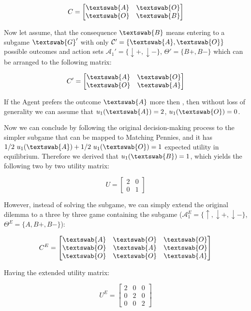 \documentclass{article}
\begin{document}
\[
C=
\begin{bmatrix}
\textswab{A} & \textswab{O} \\
\textswab{O} & \textswab{B}
\end{bmatrix}
\]

Now let assume, that the consequence $\textswab{B}$ means entering to a subgame $\textswab{G}'$ with only $\mathcal{C}'=\{\textswab{A},\textswab{O}\}$ possible outcomes and action sets $\mathcal{A}_1'=\{\downarrow+,\downarrow-\}$, $\Theta'=\{B+,B-\}$ which can be arranged to the following matrix:

\[
C'=
\begin{bmatrix}
\textswab{A} & \textswab{O} \\
\textswab{O} & \textswab{A}
\end{bmatrix}
\]

If the Agent prefers the outcome $\textswab{A}$ more then , then without loss of generality we can assume that $u_1(\textswab{A})=2$, $u_1(\textswab{O})=0$.

Now we can conclude by following the original decision-making process to the simpler subgame that can be mapped to Matching Pennies, and it has $1/2 \ u_1(\textswab{A}) + 1/2 \ u_1(\textswab{O}) = 1$ expected utility in equilibrium. Therefore we derived that $u_1(\textswab{B}) = 1$, which yields the following two by two utility matrix:

\[
U=
\begin{bmatrix}
2 & 0 \\
0 & 1
\end{bmatrix}
\]

However, instead of solving the subgame, we can simply extend the original dilemma to a three by three game containing the subgame ($\mathcal{A}^E_1=\{\uparrow,\downarrow+,\downarrow-\}$, $\Theta^E=\{A,B+,B-\}$):

\[
C^E=
\begin{bmatrix}
\textswab{A} & \textswab{O} & \textswab{O} \\
\textswab{O} & \textswab{A} & \textswab{O} \\
\textswab{O} & \textswab{O} & \textswab{A}
\end{bmatrix}
\]

Having the extended utility matrix:

\[
U^E=
\begin{bmatrix}
2 & 0 & 0 \\
0 & 2 & 0 \\
0 & 0 & 2 
\end{bmatrix}
\]
\end{document}
